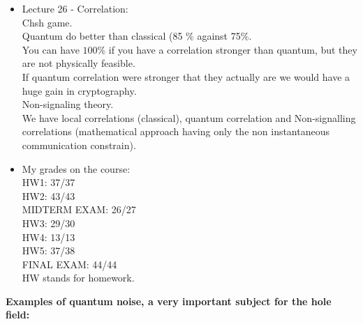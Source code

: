 \documentclass{article}
\begin{document}
\begin{itemize}
    \item {Lecture 26 - Correlation:}\\
    Chsh game.\\
    Quantum do better than classical (85 \% against 75\%.\\
    You can have $100\%$ if you have a correlation stronger than quantum, but they are not physically feasible.\\
    If quantum correlation were stronger that they actually are we would have a huge gain in cryptography.\\
    Non-signaling theory.\\
    We have local correlations (classical), quantum correlation and Non-signalling correlations (mathematical approach having only the non instantaneous communication constrain).\\

    \item My grades on the course: \\
    HW1: 37/37\\
    HW2: 43/43\\
    MIDTERM EXAM: 26/27\\
    HW3: 29/30\\
    HW4: 13/13\\
    HW5: 37/38\\
    FINAL EXAM: 44/44\\
    HW stands for homework.\\
    
    \end{itemize}

    \textbf{Examples of quantum noise, a very important subject for the hole field:}\\
    
\end{document}
